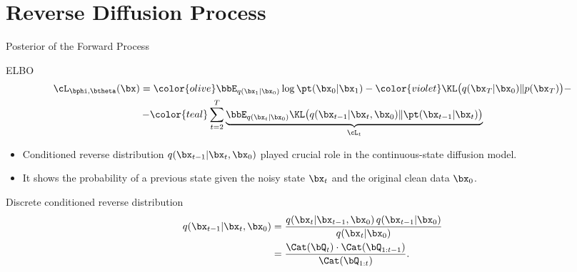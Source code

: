 \documentclass{beamer}
\begin{document}
\section{Reverse Diffusion Process}
\begin{frame}{Posterior of the Forward Process}
	\begin{block}{ELBO}
		\vspace{-0.7cm}
		\begin{multline*}
            \cL_{\bphi, \btheta}(\bx) =  {\color{olive}\bbE_{q(\bx_1 | \bx_0)} \log \pt(\bx_0 | \bx_1)} - {\color{violet}\KL\bigl(q(\bx_T | \bx_0) \| p(\bx_T)\bigr)} - \\
            - {\color{teal}\sum_{t=2}^T \underbrace{ \bbE_{q(\bx_t | \bx_0)} \KL \bigl(q(\bx_{t-1} | \bx_t, \bx_0) \| \pt(\bx_{t-1} | \bx_t)\bigr)}_{\cL_t}}
        \end{multline*}
		\vspace{-0.7cm}
	\end{block}
	\eqpause
	\begin{itemize}
		\item Conditioned reverse distribution $q(\bx_{t-1} | \bx_t, \bx_0)$ played crucial role in the continuous-state diffusion model.
		\item It shows the probability of a previous state given the noisy state $\bx_t$ and the original clean data $\bx_0$.
	\end{itemize}
	\eqpause
	\begin{block}{Discrete conditioned reverse distribution}
		\vspace{-0.7cm}
		\begin{align*}
			q(\bx_{t-1} | \bx_t, \bx_0)
			&= \frac{q(\bx_t | \bx_{t-1}, \bx_0)\, q(\bx_{t-1} | \bx_0)}
			        {q(\bx_t | \bx_0)} \\
			&= \frac{\Cat(\bQ_t) \cdot \Cat(\bQ_{1:t-1})}{\Cat(\bQ_{1:t})}.
		\end{align*}
	\end{block}
\end{frame}
\end{document}
